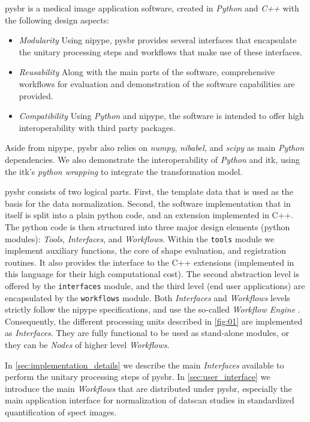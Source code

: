 \documentclass{frontiers}
\newcommand{\emitem}[1]{\item \emph{#1}}
\begin{document}
\Gls*{pysbr} is a medical image application software, created
  in \emph{Python} and \emph{C++} with the following design aspects:

\begin{itemize}
  \emitem{Modularity} Using \gls*{nipype}, \gls*{pysbr} provides
    several interfaces that encapsulate the unitary processing steps
    and workflows that make use of these interfaces.

  \emitem{Reusability} Along with the main parts of the software,
    comprehensive workflows for evaluation and demonstration of the 
    software capabilities are provided.

  \emitem{Compatibility} Using \emph{Python} and \gls*{nipype}, the
    software is intended to offer high interoperability with third party
      packages.
\end{itemize}

Aside from \gls*{nipype}, \Gls*{pysbr} also relies on \emph{numpy},
  \emph{nibabel}, and \emph{scipy} as main \emph{Python} dependencies.
We also demonstrate the interoperability of \emph{Python} and \gls*{itk},
  using the \gls*{itk}'s \emph{python wrapping} to integrate the
  transformation model. %

\Gls*{pysbr} consists of two logical parts.
First, the template data that is used as the basis for the data normalization.
Second, the software implementation that in itself is split into a plain
  python code, and an extension implemented in C++.
The python code is then structured into three major design elements (python modules):
  \emph{Tools}, \emph{Interfaces}, and \emph{Workflows}.
Within the \texttt{tools} module we implement auxiliary functions,
    the core of shape evaluation, and registration routines.
It also provides the interface to the C++ extensions
    (implemented in this language for their high computational cost).
The second abstraction level is offered by the \texttt{interfaces} module, and
  the third level (end user applications) are encapsulated by the \texttt{workflows} module.
Both \emph{Interfaces} and \emph{Workflows} levels strictly follow the
  \gls*{nipype} specifications, and use the so-called \emph{Workflow Engine}
  \citep{gorgolewski_nipype:_2011}.
Consequently, the different processing units described in \autoref{fig:01} 
  are implemented as \emph{Interfaces}. 
They are fully functional to be used as stand-alone modules, or 
  they can be \emph{Nodes} of higher level \emph{Workflows}.
  
In \autoref{sec:implementation_details} we describe the main \emph{Interfaces}
  available to perform the unitary processing steps of \gls*{pysbr}.
In \autoref{sec:user_interface} we introduce the main \emph{Workflows} that are
  distributed under \gls*{pysbr}, especially the main application interface
  for normalization of \gls*{datscan} studies in standardized
  quantification of \gls*{spect} images.
\end{document}
